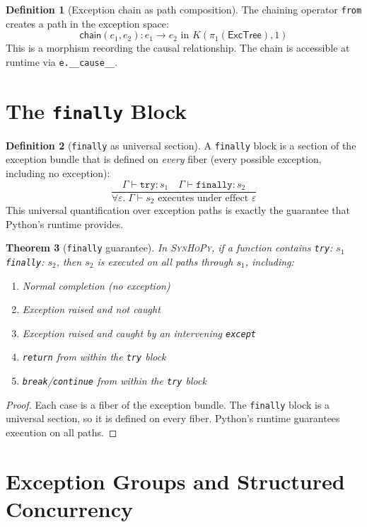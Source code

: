 \documentclass[11pt,a4paper]{report}
\theoremstyle{definition}
\newtheorem{definition}{Definition}[chapter]
\theoremstyle{plain}
\newtheorem{theorem}[definition]{Theorem}
\newcommand{\synhopy}{\textsc{SynHoPy}}
\begin{document}
\begin{definition}[Exception chain as path composition]
The chaining operator \texttt{from} creates a path in the exception space:
\[
  \mathsf{chain}(e_1, e_2) : e_1 \to e_2 \text{ in } K(\pi_1(\mathsf{ExcTree}), 1)
\]
This is a morphism recording the causal relationship.  The chain is accessible
at runtime via \lstinline[style=python]{e.__cause__}.
\end{definition}

\section{The \texttt{finally} Block}

\begin{definition}[\texttt{finally} as universal section]
A \texttt{finally} block is a section of the exception bundle that is
defined on \emph{every} fiber (every possible exception, including no exception):
\[
  \frac{
    \Gamma \vdash \texttt{try}: s_1 \quad
    \Gamma \vdash \texttt{finally}: s_2
  }{
    \forall \varepsilon.\; \Gamma \vdash s_2 \text{ executes under effect } \varepsilon
  }
\]
This universal quantification over exception paths is exactly the guarantee
that Python's runtime provides.
\end{definition}

\begin{theorem}[\texttt{finally} guarantee]
In \synhopy{}, if a function contains \texttt{try}: $s_1$ \texttt{finally}: $s_2$,
then $s_2$ is executed on all paths through $s_1$, including:
\begin{enumerate}
  \item Normal completion (no exception)
  \item Exception raised and not caught
  \item Exception raised and caught by an intervening \texttt{except}
  \item \texttt{return} from within the \texttt{try} block
  \item \texttt{break}/\texttt{continue} from within the \texttt{try} block
\end{enumerate}
\end{theorem}
\begin{proof}
Each case is a fiber of the exception bundle.  The \texttt{finally} block is
a universal section, so it is defined on every fiber.  Python's runtime
guarantees execution on all paths.
\end{proof}

\section{Exception Groups and Structured Concurrency}
\end{document}
